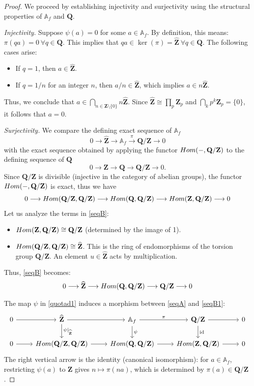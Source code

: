 \documentclass[10pt,a4paper]{amsart}
\newcommand{\A}{\mathbb{A}}
\def\Hom{\rm{Hom}}
\newcommand{\Q}{\mathbf{Q}}
\newcommand{\Z}{\mathbf{Z}}
\newcommand{\Zhat}{\widehat{\Z}}
\begin{document}
\begin{proof}
We proceed by establishing injectivity and surjectivity using the structural properties of $\A_f$ and $\Q$.

\emph{Injectivity.} 
Suppose $\psi(a) = 0$ for some $a \in \A_f$. By definition, this means:
$
\pi(qa) = 0~ \forall q \in \Q
$. 
This implies that $qa \in \ker(\pi) = \Zhat~ \forall q \in \Q$. The following cases arise:
\begin{itemize}[leftmargin=*, labelindent=0pt]
    \item[] If $q=1$, then  $a \in \Zhat$.
    \item[] If $q=1/n$ for an integer $n$, then $a/n \in \Zhat$, which implies $a \in n\Zhat$.
\end{itemize}
Thus, we conclude that $a \in \bigcap_{n \in \Z \setminus \{0\}} n\Zhat$.
Since $\Zhat \cong \prod_p \Z_p$ and $\bigcap_k p^k \Z_p = \{0\}$, it follows that $a = 0$.

\emph{Surjectivity.} 
We compare the defining exact sequence of $\A_f$ 
\begin{equation}\label{seqA}
0 \longrightarrow \Zhat \longrightarrow \A_f \xrightarrow{\pi} \Q/\Z \longrightarrow 0
\end{equation}
with the exact sequence obtained by applying the functor $\Hom(-, \Q/\Z)$ to the defining sequence of $\Q$ 
\[0 \to \Z \to \Q \to \Q/\Z \to 0.
\]
Since $\Q/\Z$ is divisible (injective in the category of abelian groups), the functor $\Hom(-, \Q/\Z)$ is exact, thus we have
\begin{equation}\label{seqB}
0 \longrightarrow \Hom(\Q/\Z, \Q/\Z) \longrightarrow \Hom(\Q, \Q/\Z) \longrightarrow \Hom(\Z, \Q/\Z) \longrightarrow 0
\end{equation}
Let us analyze the terms in \eqref{seqB}:
\begin{itemize}[leftmargin=*, labelindent=0pt]
    \item[] $\Hom(\Z, \Q/\Z) \cong \Q/\Z$ (determined by the image of 1).
    \item[] $\Hom(\Q/\Z, \Q/\Z) \cong \Zhat$. This is the ring of endomorphisms of the torsion group $\Q/\Z$. An element $u \in \Zhat$ acts by multiplication.
\end{itemize}
Thus, \eqref{seqB} becomes:
\begin{equation}\label{seqB1}
0 \longrightarrow \Zhat \longrightarrow \Hom(\Q, \Q/\Z) \longrightarrow \Q/\Z \longrightarrow 0
\end{equation}


The map $\psi$ in \eqref{quotad1} induces a morphism between \eqref{seqA} and \eqref{seqB1}:
\[
\begin{tikzcd}
0 \arrow[r] & \Zhat \arrow[r] \arrow[d, "\psi|_{\Zhat}"] & \A_f \arrow[r, "\pi"] \arrow[d, "\psi"] & \Q/\Z \arrow[r] \arrow[d, "\text{id}"] & 0 \\
0 \arrow[r] & \Hom(\Q/\Z, \Q/\Z) \arrow[r] & \Hom(\Q, \Q/\Z) \arrow[r] & \Hom(\Z, \Q/\Z) \arrow[r] & 0
\end{tikzcd}
\]
The right vertical arrow is the identity (canonical isomorphism): for $a \in \A_f$, restricting $\psi(a)$ to $\Z$ gives $n \mapsto \pi(na)$, which is determined by $\pi(a) \in \Q/\Z$.
 

\end{proof}
\end{document}
